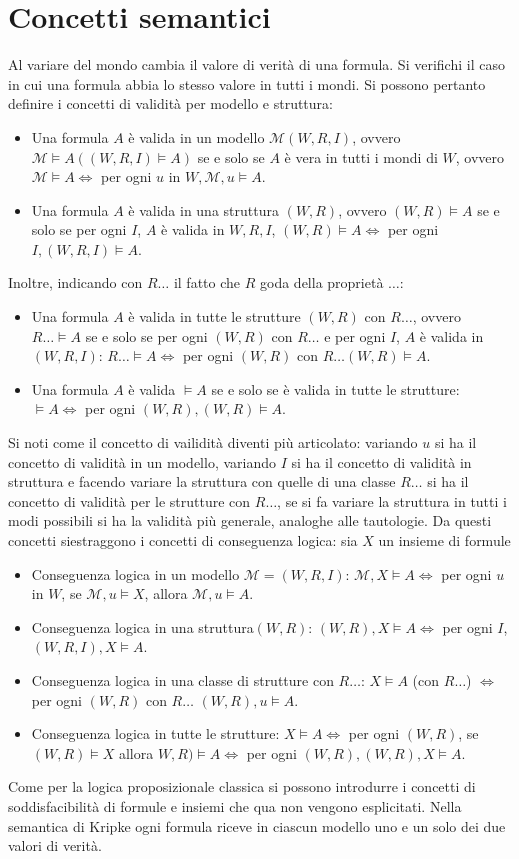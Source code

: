 \section{Concetti semantici}
Al variare del mondo cambia il valore di verit\`a di una formula. Si verifichi il caso in cui una formula abbia lo stesso valore in tutti i mondi. Si possono pertanto definire i concetti di validit\`a per modello e 
struttura:
\begin{itemize}
\item Una formula $A$ \`e valida in un modello $\mathcal{M}(W, R, I)$, ovvero $\mathcal{M}\models A((W, R, I)\models A)$ se e solo se $A$ \`e vera in tutti i mondi di $W$, ovvero $\mathcal{M}\models A
\Leftrightarrow$ per ogni $u$ in $W, \mathcal{M}, u\models A$.
\item Una formula $A$ \`e valida in una struttura $(W, R)$, ovvero $(W, R)\models A$ se e solo se per ogni $I$, $A$ \`e valida in $W, R, I$, $(W, R)\models A\Leftrightarrow$ per ogni $I, (W, R, I)\models A$.
\end{itemize}
Inoltre, indicando con $R\dots$ il fatto che $R$ goda della propriet\`a $\dots$:
\begin{itemize}
\item Una formula $A$ \`e valida in tutte le strutture $(W, R)$ con $R\dots$, ovvero $R\dots\models A$ se e solo se per ogni $(W, R)$ con $R\dots$ e per ogni $I$, $A$ \`e valida in $(W, R, I)$: 
$R\dots\models A\Leftrightarrow$ per ogni $(W, R)$ con $R\dots(W, R)\models A$.
\item Una formula $A$ \`e valida  $\models A$ se e solo se \`e valida in tutte le strutture: $\models A\Leftrightarrow$ per ogni $(W, R), (W, R)\models A$. 
\end{itemize}
Si noti come il concetto di vailidit\`a diventi pi\`u articolato: variando $u$ si ha il concetto di validit\`a in un modello, variando $I$ si ha il concetto di validit\`a in struttura e facendo variare la struttura con quelle
di una classe $R\dots$ si ha il concetto di validit\`a per le strutture con $R\dots$, se si fa variare la struttura in tutti i modi possibili si ha la validit\`a pi\`u generale, analoghe alle tautologie. Da questi concetti 
siestraggono i concetti di conseguenza logica: sia $X$ un insieme di formule
\begin{itemize}
\item Conseguenza logica in un modello $\mathcal{M}=(W, R, I)$: $\mathcal{M}, X\models A\Leftrightarrow$ per ogni $u$ in $W$, se $\mathcal{M}, u\models X$, allora $\mathcal{M},u\models A$.
\item Conseguenza logica in una struttura$(W, R)$: $(W, R), X\models A\Leftrightarrow$ per ogni $I$, $(W, R, I), X\models A$.
\item Conseguenza logica in una classe di strutture con $R\dots$: $ X\models A$ (con $R\dots$) $\Leftrightarrow$ per ogni $(W, R)$ con $R\dots$ $(W, R),u\models A$.
\item Conseguenza logica in tutte le strutture: $ X\models A\Leftrightarrow$ per ogni $(W, R)$, se $(W, R)\models X$ allora $W, R)\models A\Leftrightarrow$ per ogni $(W, R), (W, R), X\models A$.
\end{itemize}
Come per la logica proposizionale classica si possono introdurre i concetti di soddisfacibilit\`a di formule e insiemi che qua non vengono esplicitati. Nella semantica di Kripke ogni formula riceve in ciascun 
modello uno e un solo dei due valori di verit\`a. 